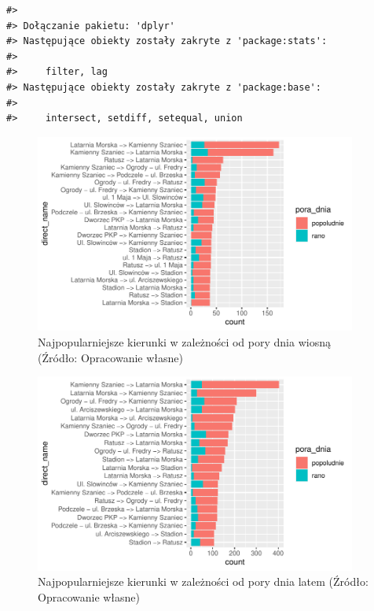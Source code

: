\documentclass{amuthesis}
\begin{document}
\begin{verbatim}
#> 
#> Dołączanie pakietu: 'dplyr'
#> Następujące obiekty zostały zakryte z 'package:stats':
#> 
#>     filter, lag
#> Następujące obiekty zostały zakryte z 'package:base':
#> 
#>     intersect, setdiff, setequal, union
\end{verbatim}

\begin{figure}[t]

{\centering \includegraphics[width=400px]{figures/analiza12-1} 

}

\caption{Najpopularniejsze kierunki w zależności od pory dnia wiosną (Źródło: Opracowanie własne)}\label{fig:analiza12}
\end{figure}
\begin{figure}[t]

{\centering \includegraphics[width=400px]{figures/analiza13-1} 

}

\caption{Najpopularniejsze kierunki w zależności od pory dnia latem (Źródło: Opracowanie własne)}\label{fig:analiza13}
\end{figure}
\end{document}

